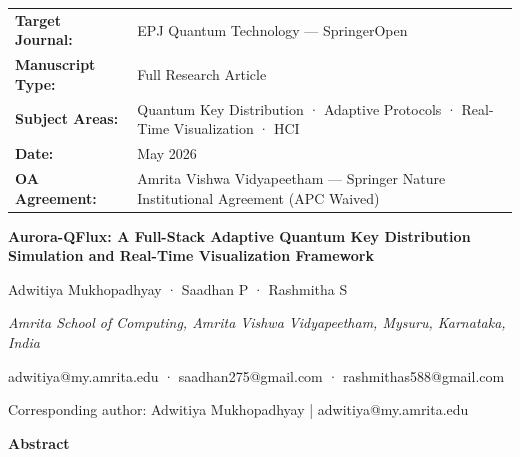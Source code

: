 \begin{center}
\begin{tabular}{ll}
\textbf{Target Journal:  } & EPJ Quantum Technology — SpringerOpen \\
\textbf{Manuscript Type: } & Full Research Article \\
\textbf{Subject Areas:   } & Quantum Key Distribution · Adaptive Protocols · Real-Time Visualization · HCI \\
\textbf{Date:            } & May 2026 \\
\textbf{OA Agreement:    } & Amrita Vishwa Vidyapeetham — Springer Nature Institutional Agreement (APC Waived) \\
\end{tabular}
\end{center}

\textbf{Aurora-QFlux: A Full-Stack Adaptive Quantum Key Distribution
Simulation and Real-Time Visualization Framework}

Adwitiya Mukhopadhyay  ·  Saadhan P  ·  Rashmitha S

\textit{Amrita School of Computing, Amrita Vishwa Vidyapeetham, Mysuru, Karnataka, India}

adwitiya@my.amrita.edu  ·  saadhan275@gmail.com  ·  rashmithas588@gmail.com

Corresponding author: Adwitiya Mukhopadhyay  |  adwitiya@my.amrita.edu

\textbf{Abstract}

